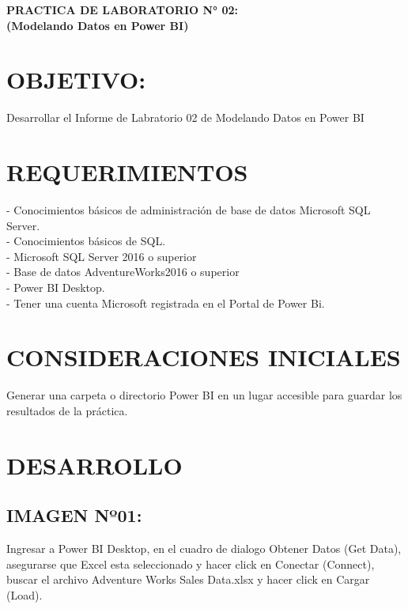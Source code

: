 \begin{center}
\vspace*{0.1in}
\begin{Large}
\textbf{PRACTICA DE LABORATORIO N° 02:} \\
\textbf{(Modelando Datos en Power BI)} \\
\end{Large}
\end{center}

\section{OBJETIVO:}
\item{
Desarrollar el Informe de Labratorio 02 de Modelando Datos en Power BI}
\section{REQUERIMIENTOS}
\begin{itemize}

- Conocimientos básicos de administración de base de datos Microsoft   SQL Server.
\\- Conocimientos básicos de SQL.
\\- Microsoft SQL Server 2016 o superior
\\- Base de datos AdventureWorks2016 o superior
\\- Power BI Desktop.
\\- Tener una cuenta Microsoft registrada en el Portal de Power Bi.
\end{itemize}
\section{CONSIDERACIONES INICIALES}
\item{Generar una carpeta o directorio Power BI en un lugar accesible para guardar los resultados de la práctica.}\\

\section{DESARROLLO}
\newpage
\subsection{IMAGEN Nº01:}
\begin{itemize}
Ingresar a Power BI Desktop, en el cuadro de dialogo Obtener Datos (Get Data), asegurarse que Excel esta seleccionado y hacer click en Conectar (Connect), buscar el archivo Adventure Works Sales Data.xlsx y hacer click en Cargar (Load).

\end{itemize} 

